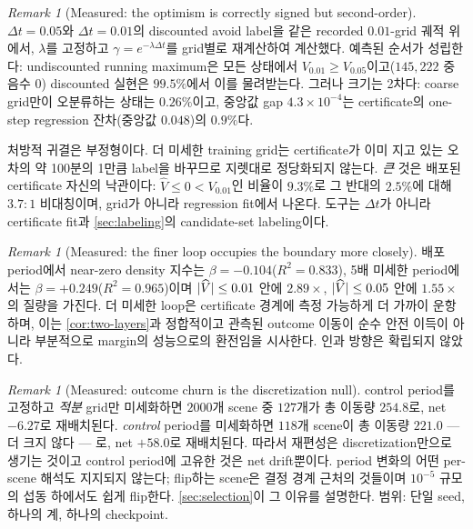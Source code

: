 \documentclass[11pt]{article}
\theoremstyle{plain}
\theoremstyle{definition}
\theoremstyle{remark}
\newtheorem{remark}[theorem]{Remark}
\DeclarePairedDelimiter{\abs}{\lvert}{\rvert}
\newcommand{\Vhat}{\widehat V}
\begin{document}
\begin{remark}[Measured: the optimism is correctly signed but second-order]\label{rem:grid-magnitude}
$\Delta t=0.05$와 $\Delta t=0.01$의 discounted avoid label을 같은 recorded $0.01$-grid 궤적 위에서,
$\lambda$를 고정하고 $\gamma=e^{-\lambda\Delta t}$를 grid별로 재계산하여 계산했다. 예측된 순서가
성립한다: undiscounted running maximum은 모든 상태에서 $V_{0.01}\ge V_{0.05}$이고($145{,}222$ 중
음수 $0$) discounted 실현은 $99.5\%$에서 이를 물려받는다. 그러나 크기는 2차다: coarse grid만이
오분류하는 상태는 $0.26\%$이고, 중앙값 gap $4.3\times10^{-4}$는 certificate의 one-step regression
잔차(중앙값 $0.048$)의 $0.9\%$다.

처방적 귀결은 부정형이다. 더 미세한 training grid는 certificate가 이미 지고 있는 오차의 약
100분의 1만큼 label을 바꾸므로 지렛대로 정당화되지 않는다. \emph{큰} 것은 배포된 certificate 자신의
낙관이다: $\Vhat\le0<V_{0.01}$인 비율이 $9.3\%$로 그 반대의 $2.5\%$에 대해 $3.7\!:\!1$
비대칭이며, grid가 아니라 regression fit에서 나온다. 도구는 $\Delta t$가 아니라 certificate fit과
\cref{sec:labeling}의 candidate-set labeling이다.
\end{remark}

\begin{remark}[Measured: the finer loop occupies the boundary more closely]\label{rem:occupancy}
배포 period에서 near-zero density 지수는 $\beta=-0.104$($R^2=0.833$), 5배 미세한 period에서는
$\beta=+0.249$($R^2=0.965$)이며 $\abs{\Vhat}\le0.01$ 안에 $2.89\times$, $\abs{\Vhat}\le0.05$ 안에
$1.55\times$의 질량을 가진다. 더 미세한 loop은 certificate 경계에 측정 가능하게 더 가까이 운항하며,
이는 \cref{cor:two-layers}과 정합적이고 관측된 outcome 이동이 순수 안전 이득이 아니라 부분적으로
margin의 성능으로의 환전임을 시사한다. 인과 방향은 확립되지 않았다.
\end{remark}

\begin{remark}[Measured: outcome churn is the discretization null]\label{rem:churn-null}
control period를 고정하고 \emph{적분} grid만 미세화하면 $2000$개 scene 중 $127$개가 총 이동량
$254.8$로, net $-6.27$로 재배치된다. \emph{control} period를 미세화하면 $118$개 scene이 총 이동량
$221.0$ --- 더 크지 않다 --- 로, net $+58.0$로 재배치된다. 따라서 재편성은 discretization만으로
생기는 것이고 control period에 고유한 것은 net drift뿐이다. period 변화의 어떤 per-scene 해석도
지지되지 않는다; flip하는 scene은 결정 경계 근처의 것들이며 $10^{-5}$ 규모의 섭동 하에서도 쉽게
flip한다. \cref{sec:selection}이 그 이유를 설명한다. 범위: 단일 seed, 하나의 계, 하나의 checkpoint.
\end{remark}
\end{document}
